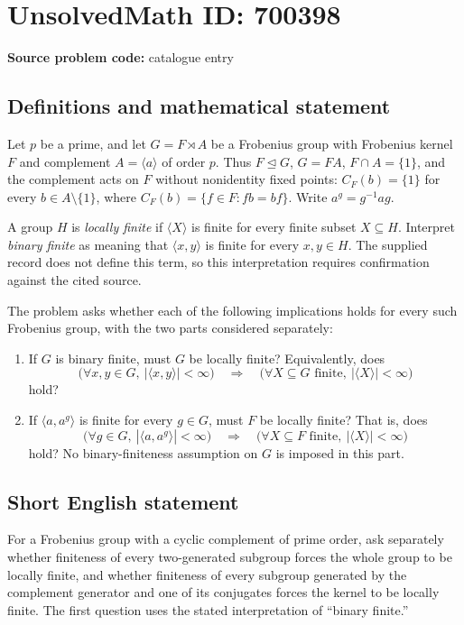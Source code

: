 \documentclass[11pt]{article}
\begin{document}
\section*{UnsolvedMath ID: 700398}
\textbf{Source problem code:} catalogue entry
\subsection{Definitions and mathematical statement}
Let \(p\) be a prime, and let \(G=F\rtimes A\) be a Frobenius group with Frobenius kernel \(F\) and complement \(A=\langle a\rangle\) of order \(p\). Thus \(F\trianglelefteq G\), \(G=FA\), \(F\cap A=\{1\}\), and the complement acts on \(F\) without nonidentity fixed points: \(C_F(b)=\{1\}\) for every \(b\in A\setminus\{1\}\), where \(C_F(b)=\{f\in F:fb=bf\}\). Write \(a^g=g^{-1}ag\).

A group \(H\) is \emph{locally finite} if \(\langle X\rangle\) is finite for every finite subset \(X\subseteq H\). Interpret \emph{binary finite} as meaning that \(\langle x,y\rangle\) is finite for every \(x,y\in H\). The supplied record does not define this term, so this interpretation requires confirmation against the cited source.

The problem asks whether each of the following implications holds for every such Frobenius group, with the two parts considered separately:
\begin{enumerate}
\item[(a)] If \(G\) is binary finite, must \(G\) be locally finite? Equivalently, does
\[
\bigl(\forall x,y\in G,\ |\langle x,y\rangle|<\infty\bigr)
\quad\Longrightarrow\quad
\bigl(\forall X\subseteq G\text{ finite},\ |\langle X\rangle|<\infty\bigr)
\]
hold?
\item[(b)] If \(\langle a,a^g\rangle\) is finite for every \(g\in G\), must \(F\) be locally finite? That is, does
\[
\bigl(\forall g\in G,\ |\langle a,a^g\rangle|<\infty\bigr)
\quad\Longrightarrow\quad
\bigl(\forall X\subseteq F\text{ finite},\ |\langle X\rangle|<\infty\bigr)
\]
hold? No binary-finiteness assumption on \(G\) is imposed in this part.
\end{enumerate}
\subsection{Short English statement}
For a Frobenius group with a cyclic complement of prime order, ask separately whether finiteness of every two-generated subgroup forces the whole group to be locally finite, and whether finiteness of every subgroup generated by the complement generator and one of its conjugates forces the kernel to be locally finite. The first question uses the stated interpretation of ``binary finite.''
\end{document}
